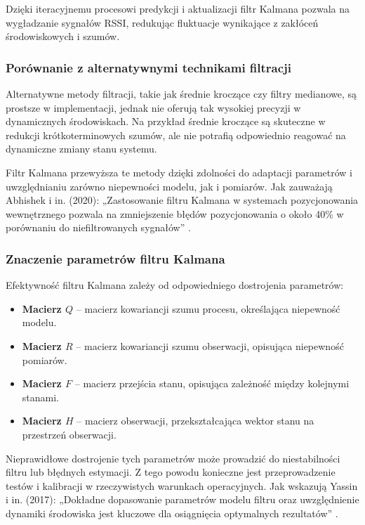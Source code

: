 Dzięki iteracyjnemu procesowi predykcji i aktualizacji filtr Kalmana pozwala na wygładzanie sygnałów RSSI, redukując fluktuacje wynikające z zakłóceń środowiskowych i szumów.

\subsubsection{Porównanie z alternatywnymi technikami filtracji}

Alternatywne metody filtracji, takie jak średnie kroczące czy filtry medianowe, są prostsze w implementacji, jednak nie oferują tak wysokiej precyzji w dynamicznych środowiskach. Na przykład średnie kroczące są skuteczne w redukcji krótkoterminowych szumów, ale nie potrafią odpowiednio reagować na dynamiczne zmiany stanu systemu.

Filtr Kalmana przewyższa te metody dzięki zdolności do adaptacji parametrów i uwzględnianiu zarówno niepewności modelu, jak i pomiarów. 
Jak zauważają Abhishek i in. (2020): „Zastosowanie filtru Kalmana w systemach pozycjonowania wewnętrznego pozwala na zmniejszenie błędów pozycjonowania o około 40\% w porównaniu do niefiltrowanych sygnałów” \cite{Abhishek2020}.

\subsubsection{Znaczenie parametrów filtru Kalmana}

Efektywność filtru Kalmana zależy od odpowiedniego dostrojenia parametrów:
\begin{itemize}
    \item \textbf{Macierz $Q$} – macierz kowariancji szumu procesu, określająca niepewność modelu.
    \item \textbf{Macierz $R$} – macierz kowariancji szumu obserwacji, opisująca niepewność pomiarów.
    \item \textbf{Macierz $F$} – macierz przejścia stanu, opisująca zależność między kolejnymi stanami.
    \item \textbf{Macierz $H$} – macierz obserwacji, przekształcająca wektor stanu na przestrzeń obserwacji.
\end{itemize}

Nieprawidłowe dostrojenie tych parametrów może prowadzić do niestabilności filtru lub błędnych estymacji. Z tego powodu konieczne jest przeprowadzenie testów i kalibracji w rzeczywistych warunkach operacyjnych. Jak wskazują Yassin i in. (2017): „Dokładne dopasowanie parametrów modelu filtru oraz uwzględnienie dynamiki środowiska jest kluczowe dla osiągnięcia optymalnych rezultatów” \cite{Yassin2017}.

